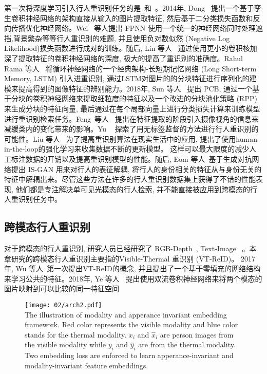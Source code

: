 第一次将深度学习引入行人重识别任务的是~\cite{yi2014deep}和~\cite{li2014deepreid}。2014年, Dong~\cite{yi2014deep} 提出一个基于孪生卷积神经网络的架构直接从输入的图片提取特征, 然后基于二分类损失函数和反向传播优化神经网络。Wei~\cite{li2014deepreid} 等人提出 FPNN 使用一个统一的神经网络同时处理遮挡,背景繁杂等等行人重识别的难题, 并且使用负对数似然 (Negative Log Likelihood)损失函数进行成对的训练。随后, Lin 等人~\cite{wu2016personnet} 通过使用更小的卷积核加深了提取特征的卷积神经网络的深度, 极大的提高了重识别的准确度。Rahul Rama 等人~\cite{varior2016siamese} 将循环神经网络的一个经典架构-长短期记忆网络 (Long Short-term Memory, LSTM) 引入进重识别, 通过LSTM对图片的的分块特征进行序列化的建模来提高得到的图像特征的辨别能力。2018年, Sun 等人~\cite{sun2018beyond} 提出 PCB, 通过一个基于分块的卷积神经网络来提取细粒度的特征以及一个改进的分块池化策略 (RPP)来生成分块的特征向量, 最后通过在每个局部向量上进行分类损失计算来训练模型进行重识别检索任务。Feng~等人~\cite{feng2018learning} 提出在特征提取的阶段引入摄像视角的信息来减缓类内的变化带来的影响。Yu ~\cite{yu2019unsupervised} 探索了用无标签监督的方法进行行人重识别的可能性。Liu 等人~\cite{liu2019deep} 为了提高重识别算法在现实生活中的应用, 提出了使用human-in-the-loop的强化学习来收集数据不断的更新模型。 这样可以最大限度的减少人工标注数据的开销以及提高重识别模型的性能。随后, Eom 等人~\cite{eom2019learning}基于生成对抗网络提出 IS-GAN 用来对行人的表征解耦, 将行人的身份相关的特征从与身份无关的特征中解耦出来。尽管这些方法在许多的行人重识别数据集上获得了不错的性能表现, 他们都是专注解决单可见光模态的行人检索, 并不能直接被应用到跨模态的行人重识别任务中。
\subsection{跨模态行人重识别}
对于跨模态的行人重识别, 研究人员已经研究了 RGB-Depth~\cite{haque2016recurrent, munaro20143d, wu2017robust},  Text-Image ~\cite{li2017identity,li2017person,ye2015specific, yin2017adversarial}。本章研究的跨模态行人重识别主要指的Visible-Thermal 重识别 (VT-ReID)。 2017年, Wu 等人~\cite{wu2017rgb}第一次提出VT-ReID的概念, 并且提出了一个基于零填充的网络结构来学习公共的特征。2018年, Ye 等人~\cite{ye2018visible} 提出使用双流卷积神经网络来将两个模态的图片映射到可以比较的同一特征空间
\begin{figure}[!htp]
    \centering
    \texttt{[image: 02/arch2.pdf]} \\
      {The illustration of modality and apperance invariant embedding framework. Red color represents the visible modality and blue color stands for the thermal modality. $x_i$ and $\hat{x}_i$ are person images from the visible modality while $y_i$ and $\hat{y}_i$ are from the thermal modality. Two embedding loss are enforced to learn  apperance-invariant and modality-invariant feature embeddings.}   
      \label{fig:arch2}
\end{figure} 


